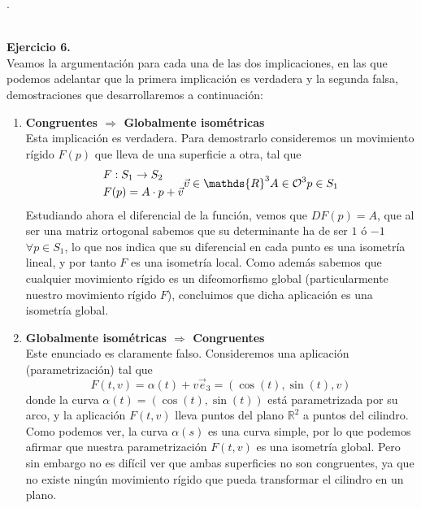 \documentclass[fleqn]{article}
\def\R{\mathds{R}}
\begin{document}
.\\ \\

    \newpage
    











    \textbf{Ejercicio 6. } \\

    Veamos la argumentación para cada una de las dos implicaciones, en las que podemos adelantar que la primera implicación es verdadera y la segunda falsa, 
    demostraciones que desarrollaremos a continuación:
    \begin{enumerate}
        \item \textbf{Congruentes $\Rightarrow$ Globalmente isométricas} \\
                Esta implicación es verdadera. Para demostrarlo consideremos un movimiento rígido $F(p)$ que lleva de una superficie a otra, tal que
                \begin{equation*}
                    \begin{aligned}
                        &F: S_1 \rightarrow S_2\\
                        &F(p) = A\cdot p + \vec{v}
                    \end{aligned}\\
                    \vec{v} \in \R^3\\
                    A \in \mathcal{O}^3 \\
                    p \in S_1
                \end{equation*}
                Estudiando ahora el diferencial de la función, vemos que $DF(p) = A$, que al ser una matriz ortogonal sabemos que su determinante ha de ser $1$ ó $-1$ $\forall p \in S_1$, 
                lo que nos indica que su diferencial en cada punto es una isometría lineal, y por tanto $F$ es una isometría local. Como además sabemos que cualquier movimiento rígido
                es un difeomorfismo global (particularmente nuestro movimiento rígido $F$), concluimos que dicha aplicación es una isometría global.

        \item \textbf{Globalmente isométricas $\Rightarrow$ Congruentes} \\
                Este enunciado es claramente falso. Consideremos una aplicación (parametrización) tal que
                $$F(t, v) = \alpha(t) + v \vec{e}_3 = (\cos (t), \sin (t), v)$$
                donde la curva $\alpha(t) = (\cos (t), \sin (t))$ está parametrizada por su arco, y la aplicación $F(t,v)$ lleva puntos del plano $\R^2$ a puntos del cilindro. Como podemos ver,
                la curva $\alpha(s)$ es una curva simple, por lo que podemos afirmar que nuestra parametrización $F(t,v)$ es una isometría global. Pero sin embargo no es difícil ver que ambas superficies 
                no son congruentes, ya que no existe ningún movimiento rígido que pueda transformar el cilindro en un plano.
    \end{enumerate}
\end{document}
